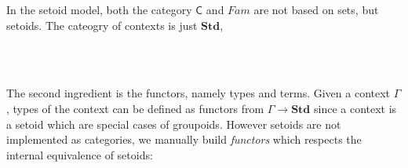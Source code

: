 In the setoid model, both the category $\mathsf{C}$ and $Fam$ are not based on sets, but setoids.
The cateogry of contexts is just $\textbf{Std}$,

\begin{code}
%
\\
\> \AgdaSymbol{=} \<%
\\
\end{code}

The second ingredient is the functors, namely types and terms.
Given a context $\Gamma$, types of the context can be defined as functors from $\Gamma \to \textbf{Std}$ since a context is a setoid which are special cases of groupoids. However setoids are not implemented as categories, we manually build \emph{functors} which respects the internal equivalence of setoids:

